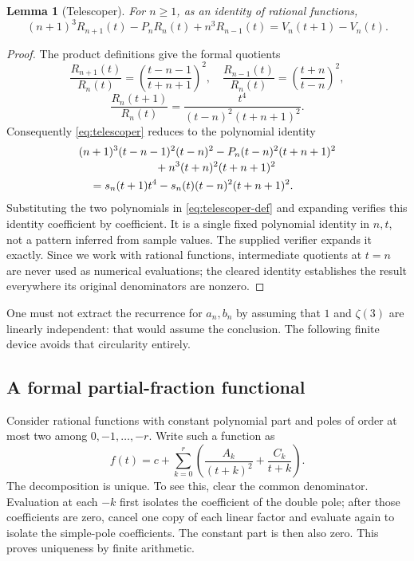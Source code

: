 \documentclass[11pt]{article}
\newtheorem{lemma}[theorem]{Lemma}
\theoremstyle{definition}\newtheorem{definition}[theorem]{Definition}
\theoremstyle{remark}\newtheorem{remark}[theorem]{Remark}
\begin{document}
\begin{lemma}[Telescoper]\label{lem:telescoper}
For $n\ge1$, as an identity of rational functions,
\begin{equation}\label{eq:telescoper}
 (n+1)^3R_{n+1}(t)-P_nR_n(t)+n^3R_{n-1}(t)
       =V_n(t+1)-V_n(t).
\end{equation}
\end{lemma}
\begin{proof}
The product definitions give the formal quotients
\[
 \frac{R_{n+1}(t)}{R_n(t)}=\left(\frac{t-n-1}{t+n+1}\right)^2,
 \quad
 \frac{R_{n-1}(t)}{R_n(t)}=\left(\frac{t+n}{t-n}\right)^2,
\]
\[
 \frac{R_n(t+1)}{R_n(t)}=
 \frac{t^4}{(t-n)^2(t+n+1)^2}.
\]
Consequently \eqref{eq:telescoper} reduces to the polynomial identity
\begin{align}
 &(n+1)^3(t-n-1)^2(t-n)^2
  -P_n(t-n)^2(t+n+1)^2 \notag\\[-2pt]
 &\hspace{24mm}+n^3(t+n)^2(t+n+1)^2\notag\\
 &\quad=s_n(t+1)t^4-s_n(t)(t-n)^2(t+n+1)^2.\label{eq:polynomial-certificate}
\end{align}
Substituting the two polynomials in \eqref{eq:telescoper-def} and expanding
verifies this identity coefficient by coefficient. It is a single fixed
polynomial identity in $n,t$, not a pattern inferred from sample values.
The supplied verifier expands it exactly. Since we work with rational
functions, intermediate quotients at $t=n$ are never used as numerical
evaluations; the cleared identity establishes the result everywhere its
original denominators are nonzero.
\end{proof}

One must not extract the recurrence for $a_n,b_n$ by assuming that $1$ and
$\zeta(3)$ are linearly independent: that would assume the conclusion.
The following finite device avoids that circularity entirely.

\subsection{A formal partial-fraction functional}
Consider rational functions with constant polynomial part and poles of
order at most two among $0,-1,\ldots,-r$. Write such a function as
\[
 f(t)=c+\sum_{k=0}^{r}\left(\frac{A_k}{(t+k)^2}+\frac{C_k}{t+k}\right).
\]
The decomposition is unique. To see this, clear the common denominator.
Evaluation at each $-k$ first isolates the coefficient of the double pole;
after those coefficients are zero, cancel one copy of each linear factor
and evaluate again to isolate the simple-pole coefficients. The constant
part is then also zero. This proves uniqueness by finite arithmetic.
\end{document}
